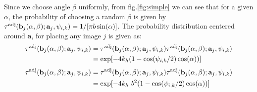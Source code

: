     Since we choose angle $\beta$ uniformly, from fig.\ref{fig:simple} we can see that for a given $\alpha$, the probability of choosing a random $\beta$ is given by $\tau^\text{adj}({\mathbf {b}}_j(\alpha, \beta);{\mathbf {a}}_j,\psi_{i,k})  = 1/[\pi b \sin (\alpha)]$. The probability distribution centered around ${\mathbf a}$, for placing any image $j$ is given as:
    \ifkhExplicitP
        \begin{equation}
        \label{eq:piTildeAlphaBeta}
            \begin{aligned}
                \tau^\text{adj}({\mathbf {b}}_j(\alpha, \beta);{\mathbf {a}}_j,\psi_{i,k}) &= \tau^\text{adj}({\mathbf {b}}_j(\alpha, \beta);{\mathbf {a}}_j,\psi_{i,k})  \tau^\text{adj}({\mathbf {b}}_j(\alpha, \beta);{\mathbf {a}}_j,\psi_{i,k})\\
                &= \exp[-4k_h (1 - \cos(\psi_{i,k}/2) \cos(\alpha))]
            \end{aligned}
        \end{equation}
    \else
        \begin{equation}
        \label{eq:piTildeAlphaBeta}
            \begin{aligned}
                \tau^\text{adj}({\mathbf {b}}_j(\alpha, \beta);{\mathbf {a}}_j,\psi_{i,k}) &= \tau^\text{adj}({\mathbf {b}}_j(\alpha, \beta);{\mathbf {a}}_j,\psi_{i,k})  \tau^\text{adj}({\mathbf {b}}_j(\alpha, \beta);{\mathbf {a}}_j,\psi_{i,k})\\
                &= \exp[-4k_h~b^2 (1 - \cos(\psi_{i,k}/2) \cos(\alpha))]
            \end{aligned}
        \end{equation}
    \fi


